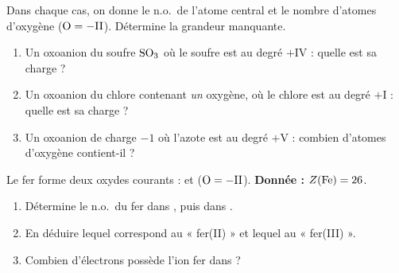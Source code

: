\documentclass[11pt,a4paper]{article}
\begin{document}
\begin{exo}
Dans chaque cas, on donne le n.o.\ de l'atome central et le nombre d'atomes d'oxygène ($\ce{O}=-\mathrm{II}$).
Détermine la grandeur manquante.
\begin{enumerate}[label=\alph*)]
  \item Un oxoanion du soufre $\ce{SO3}$ où le soufre est au degré $+\mathrm{IV}$ : quelle est sa charge ?
  \item Un oxoanion du chlore contenant \emph{un} oxygène, où le chlore est au degré $+\mathrm{I}$ : quelle est sa charge ?
  \item Un oxoanion de charge $-1$ où l'azote est au degré $+\mathrm{V}$ : combien d'atomes d'oxygène contient-il ?
\end{enumerate}
\end{exo}

\begin{exo}
Le fer forme deux oxydes courants :  et  ($\ce{O}=-\mathrm{II}$). \textbf{Donnée :} $Z(\ce{Fe})=26$.
\begin{enumerate}[label=\alph*)]
  \item Détermine le n.o.\ du fer dans , puis dans .
  \item En déduire lequel correspond au « fer(II) » et lequel au « fer(III) ».
  \item Combien d'électrons possède l'ion fer dans  ?
\end{enumerate}
\end{exo}
\end{document}

